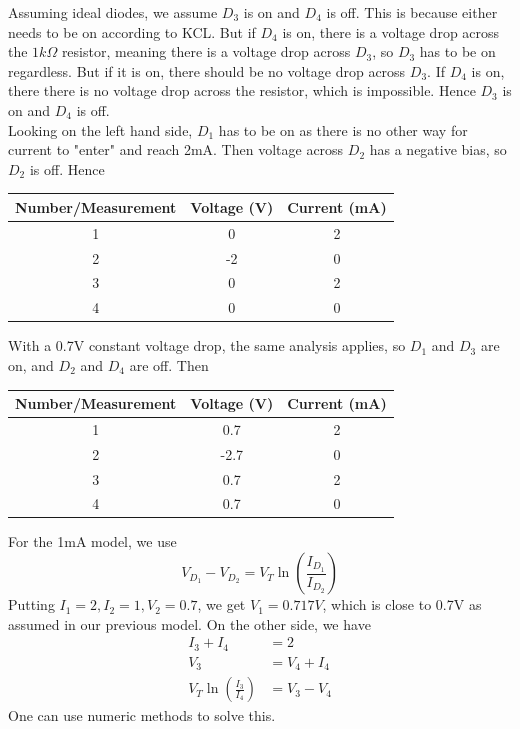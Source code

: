 \documentclass[answers]{exam}
\begin{document}
\begin{questions}
\begin{solution}
    Assuming ideal diodes, we assume $D_3$ is on and $D_4$ is off. This is because either needs to be on according to KCL. But if $D_4$ is on, there is a voltage drop across the $1\unit{k\Omega}$ resistor, meaning there is a voltage drop across $D_3$, so $D_3$ has to be on regardless. But if it is on, there should be no voltage drop across $D_3$. If $D_4$ is on, there there is no voltage drop across the resistor, which is impossible. Hence $D_3$ is on and $D_4$ is off. \\
    Looking on the left hand side, $D_1$ has to be on as there is no other way for current to "enter" and reach 2mA.  Then voltage across $D_2$ has a negative bias, so $D_2$ is off. Hence \\
    \begin{center}
    \begin{tabular}{|c||c|c|}
        \hline
        Number/Measurement & Voltage (V) & Current (mA) \\
        \hline\hline
        1 & 0 & 2 \\
        \hline
        2 & -2 & 0 \\
        \hline
        3 & 0 & 2 \\
        \hline
        4 & 0 & 0 \\
        \hline
    \end{tabular}
    \end{center}
    With a 0.7V constant voltage drop, the same analysis applies, so $D_1$ and $D_3$ are on, and $D_2$ and $D_4$ are off. Then
    \begin{center}
    \begin{tabular}{|c||c|c|}
        \hline
        Number/Measurement & Voltage (V) & Current (mA) \\
        \hline\hline
        1 & 0.7 & 2 \\
        \hline
        2 & -2.7 & 0 \\
        \hline
        3 & 0.7 & 2 \\
        \hline
        4 & 0.7 & 0 \\
        \hline
    \end{tabular}
    \end{center}
    For the 1mA model, we use
    $$V_{D_1} - V_{D_2} = V_T\ln\left(\frac{I_{D_1}}{I_{D_2}}\right)$$
    Putting $I_1 = 2, I_2 = 1, V_2 = 0.7$, we get $V_1 = 0.717\unit{V}$, which is close to 0.7V as assumed in our previous model. On the other side, we have
    \begin{align}
        I_3 + I_4 &= 2 \\
        V_3 &= V_4 + I_4 \\
        V_T\ln\left(\frac{I_3}{I_4}\right) &= V_3 - V_4
    \end{align}
    One can use numeric methods to solve this.
\end{solution}


\end{questions}
\end{document}
